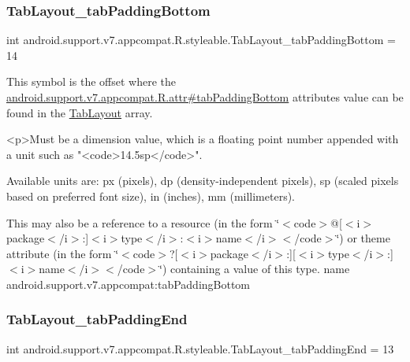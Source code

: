 \subsubsection{\texorpdfstring{Tab\+Layout\+\_\+tab\+Padding\+Bottom}{TabLayout\_tabPaddingBottom}}
{\footnotesize\ttfamily int android.\+support.\+v7.\+appcompat.\+R.\+styleable.\+Tab\+Layout\+\_\+tab\+Padding\+Bottom = 14\hspace{0.3cm}{\ttfamily [static]}}

This symbol is the offset where the \hyperlink{classandroid_1_1support_1_1v7_1_1appcompat_1_1R_1_1attr_ac6b8ff7fa2ba7d246035a5176ee4a1da}{android.\+support.\+v7.\+appcompat.\+R.\+attr\#tab\+Padding\+Bottom} attribute\textquotesingle{}s value can be found in the \hyperlink{classandroid_1_1support_1_1v7_1_1appcompat_1_1R_1_1styleable_a3c85d0c4cebbccf5b1a16ecfe13938ca}{Tab\+Layout} array.

\begin{DoxyVerb}      <p>Must be a dimension value, which is a floating point number appended with a unit such as "<code>14.5sp</code>".
\end{DoxyVerb}
 Available units are\+: px (pixels), dp (density-\/independent pixels), sp (scaled pixels based on preferred font size), in (inches), mm (millimeters). 

This may also be a reference to a resource (in the form \char`\"{}$<$code$>$@\mbox{[}$<$i$>$package$<$/i$>$\+:\mbox{]}$<$i$>$type$<$/i$>$\+:$<$i$>$name$<$/i$>$$<$/code$>$\char`\"{}) or theme attribute (in the form \char`\"{}$<$code$>$?\mbox{[}$<$i$>$package$<$/i$>$\+:\mbox{]}\mbox{[}$<$i$>$type$<$/i$>$\+:\mbox{]}$<$i$>$name$<$/i$>$$<$/code$>$\char`\"{}) containing a value of this type.  name android.\+support.\+v7.\+appcompat\+:tab\+Padding\+Bottom \mbox{\label{classandroid_1_1support_1_1v7_1_1appcompat_1_1R_1_1styleable_a82bcf12542227711510855ac622ef61d}} 
\subsubsection{\texorpdfstring{Tab\+Layout\+\_\+tab\+Padding\+End}{TabLayout\_tabPaddingEnd}}
{\footnotesize\ttfamily int android.\+support.\+v7.\+appcompat.\+R.\+styleable.\+Tab\+Layout\+\_\+tab\+Padding\+End = 13\hspace{0.3cm}{\ttfamily [static]}}

